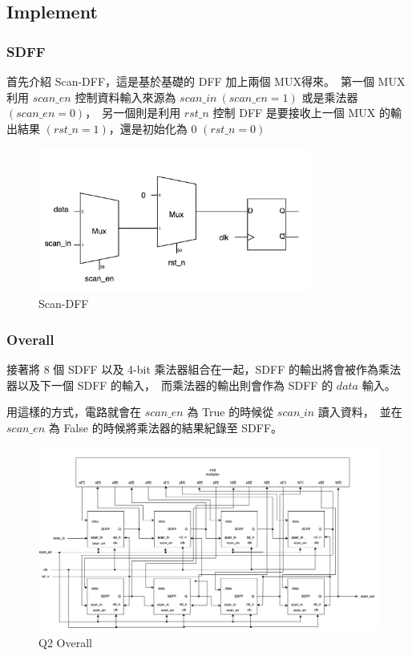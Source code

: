 \documentclass[10.5pt,compsoc,UTF8]{CjC}
\theoremstyle{mystyle}
\begin{document}
\subsection{Implement}

\subsubsection*{SDFF}
首先介紹 Scan-DFF，這是基於基礎的 DFF 加上兩個 MUX得來。\
第一個 MUX 利用 $scan\_en$ 控制資料輸入來源為 $scan\_in\ (scan\_en = 1)$ 或是乘法器 $(scan\_en = 0)$，\
另一個則是利用 $rst\_n$ 控制 DFF 是要接收上一個 MUX 的輸出結果 $(rst\_n = 1)$，還是初始化為 0 $(rst\_n = 0)$

\begin{figure}[h!]
  \centering
  \includegraphics[width=0.8\textwidth]{./img/Q2-SDFF.png}
  \caption{Scan-DFF}
  \label{fig:SDFF}
\end{figure}

\subsubsection*{Overall}
接著將 8 個 SDFF 以及 4-bit 乘法器組合在一起，SDFF 的輸出將會被作為乘法器以及下一個 SDFF 的輸入，\
而乘法器的輸出則會作為 SDFF 的 $data$ 輸入。\
\par
用這樣的方式，電路就會在 $scan\_en$ 為 True 的時候從 $scan\_in$ 讀入資料，\
並在 $scan\_en$ 為 False 的時候將乘法器的結果紀錄至 SDFF。

\begin{figure}[h!]
  \centering
  \includegraphics[width=\textwidth]{./img/Q2.png}
  \caption{Q2 Overall}
  \label{fig:Q2-Overall}
\end{figure}
\newpage
\end{document}
